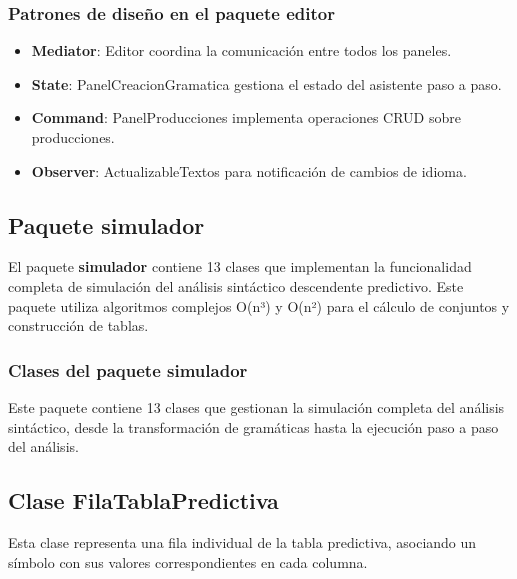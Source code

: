 \subsubsection{Patrones de diseño en el paquete editor}

\begin{itemize}
    \item \textbf{Mediator}: Editor coordina la comunicación entre todos los paneles.
    \item \textbf{State}: PanelCreacionGramatica gestiona el estado del asistente paso a paso.
    \item \textbf{Command}: PanelProducciones implementa operaciones CRUD sobre producciones.
    \item \textbf{Observer}: ActualizableTextos para notificación de cambios de idioma.
\end{itemize}

\subsection{Paquete simulador}

El paquete \textbf{simulador} contiene 13 clases que implementan la funcionalidad completa de simulación del análisis sintáctico descendente predictivo. Este paquete utiliza algoritmos complejos O(n³) y O(n²) para el cálculo de conjuntos y construcción de tablas.

\subsubsection{Clases del paquete simulador}

Este paquete contiene 13 clases que gestionan la simulación completa del análisis sintáctico, desde la transformación de gramáticas hasta la ejecución paso a paso del análisis.

\subsection{Clase FilaTablaPredictiva}

Esta clase representa una fila individual de la tabla predictiva, asociando un símbolo con sus valores correspondientes en cada columna.

